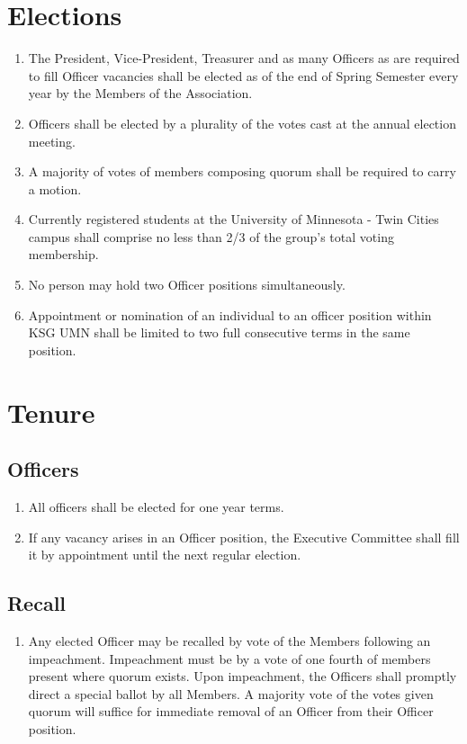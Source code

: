 \documentclass[12pt,letterpaper]{article}
\begin{document}
\section{Elections}
\begin{enumerate}
  \item The President, Vice-President, Treasurer and as many Officers as are required
        to fill Officer vacancies shall be elected as of the end of Spring Semester every
        year by the Members of the Association.
  \item Officers shall be elected by a plurality of the votes cast at the annual election
        meeting.
  \item A majority of votes of members composing quorum shall be required to carry a motion.
  \item Currently registered students at the University of Minnesota - Twin Cities campus
        shall comprise no less than 2/3 of the group's total voting membership. 
  \item No person may hold two Officer positions simultaneously.
  \item Appointment or nomination of an individual to an officer position within KSG
        UMN shall be limited to two full consecutive terms in the same position.
\end{enumerate}

\section{Tenure}

\subsection{Officers}
\begin{enumerate}
  \item All officers shall be elected for one year terms.
  \item If any vacancy arises in an Officer position, the Executive Committee shall
        fill it by appointment until the next regular election.
\end{enumerate}

\subsection{Recall}
\begin{enumerate}
  \item Any elected Officer may be recalled by vote of the Members following an
        impeachment. Impeachment must be by a vote of one fourth of members present
        where quorum exists. Upon impeachment, the Officers shall promptly direct a
        special ballot by all Members. A majority vote of the votes given quorum will
        suffice for immediate removal of an Officer from their Officer position.
\end{enumerate}
\end{document}
